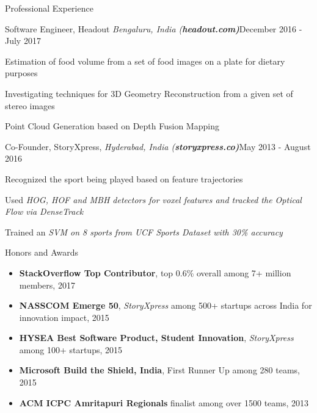 \documentclass{resume}
\begin{document}
\begin{rSection}{Professional Experience}

\begin{rSubsection}{Software Engineer, Headout \it{Bengaluru, India} (\bf{headout.com})}{December 2016 - July 2017}{}{}
\item Estimation of food volume from a set of food images on a plate for dietary purposes
\item Investigating techniques for 3D Geometry Reconstruction from a given set of stereo images
\item Point Cloud Generation based on Depth Fusion Mapping

\end{rSubsection}

\begin{rSubsection}{Co-Founder, StoryXpress, \it{Hyderabad, India} (\bf{storyxpress.co})}{May 2013 - August 2016}{}{}
\item Recognized the sport being played based on feature trajectories
\item Used \it{HOG}, \it{HOF} and \it{MBH} detectors for voxel features and tracked the Optical Flow via \it{DenseTrack}
\item Trained an \it{SVM} on 8 sports from \it{UCF Sports Dataset} with 30\% accuracy

\end{rSubsection}

\end{rSection}

\begin{rSection}{Honors and Awards}
  \begin{itemize}[label={},topsep=0pt,itemsep=-0.5ex,partopsep=1ex,parsep=1ex,leftmargin=0.25em]
    \item  {\bf StackOverflow Top Contributor}, top 0.6\% overall among 7+ million members, 2017
  \item {\bf NASSCOM Emerge 50}, {\it StoryXpress} among 500+ startups across India for innovation impact, 2015
  \item {\bf HYSEA Best Software Product, Student Innovation}, {\it StoryXpress} among 100+ startups, 2015
  \item {\bf Microsoft Build the Shield, India}, First Runner Up among 280 teams, 2015
  \item {\bf ACM ICPC Amritapuri Regionals} finalist among over 1500 teams, 2013
  \end{itemize}
\end{rSection}
\end{document}

